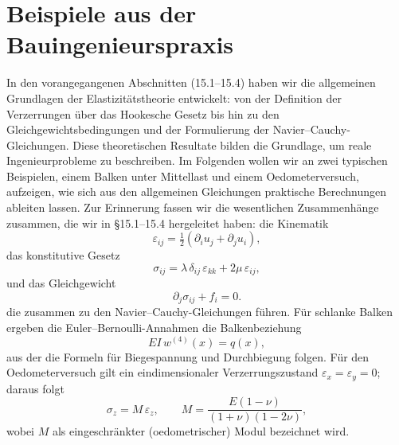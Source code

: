 %
%
%
%
\section{Beispiele aus der Bauingenieurspraxis}
\label{elastomechanik:section:teil4}
In den vorangegangenen Abschnitten (15.1–15.4) haben wir die allgemeinen Grundlagen der Elastizitätstheorie entwickelt: 
von der Definition der Verzerrungen über das Hookesche Gesetz bis hin zu den Gleichgewichtsbedingungen und der Formulierung der Navier--Cauchy-Gleichungen. 
Diese theoretischen Resultate bilden die Grundlage, um reale Ingenieurprobleme zu beschreiben. 
Im Folgenden wollen wir an zwei typischen Beispielen, einem Balken unter Mittellast und einem Oedometerversuch, aufzeigen, wie sich aus den allgemeinen Gleichungen praktische Berechnungen ableiten lassen. 
Zur Erinnerung fassen wir die wesentlichen Zusammenhänge zusammen, die wir in \S15.1–15.4 hergeleitet haben:
die Kinematik
\[
  \varepsilon_{ij} = \tfrac12(\partial_i u_j + \partial_j u_i),
\]
das konstitutive Gesetz
\[
  \sigma_{ij} = \lambda\, \delta_{ij}\,\varepsilon_{kk} + 2\mu\, \varepsilon_{ij},
\]
und das Gleichgewicht
\[
  \partial_j \sigma_{ij} + f_i = 0.
\]
die zusammen zu den Navier--Cauchy-Gleichungen führen.
Für schlanke Balken ergeben die Euler--Bernoulli-Annahmen die Balkenbeziehung
\[
  EI\, w^{(4)}(x) = q(x),
\]
aus der die Formeln für Biegespannung und Durchbiegung folgen.
Für den Oedometerversuch gilt ein eindimensionaler Verzerrungszustand
\(\varepsilon_x=\varepsilon_y=0\); daraus folgt
\[
  \sigma_z = M \,\varepsilon_z, \qquad
  M=\frac{E(1-\nu)}{(1+\nu)(1-2\nu)},
\]
wobei \(M\) als eingeschränkter (oedometrischer) Modul bezeichnet wird.

